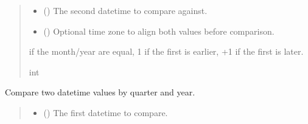 \documentclass[letterpaper,10pt,english]{sphinxmanual}
\begin{document}
\begin{fulllineitems}
\begin{fulllineitems}
\begin{quote}
\begin{description}
\begin{itemize}
\item {} 
\sphinxAtStartPar
{} () \textendash{} The second datetime to compare against.

\item {} 
\sphinxAtStartPar
{} (\sphinxstyleliteralemphasis{\sphinxupquote{{[}}}\sphinxstyleliteralemphasis{\sphinxupquote{{]}}}) \textendash{} Optional time zone to align both values before comparison.

\end{itemize}

 if the month/year are equal,
\sphinxhyphen{}1 if the first is earlier,
+1 if the first is later.

\sphinxAtStartPar
int

\end{description}\end{quote}

\end{fulllineitems}


\begin{fulllineitems}
\label{\detokenize{apache_commons_validator_python.routines:apache_commons_validator_python.routines.date_validator.DateValidator.compare_quarters}}
\pysigstartsignatures
{}
\pysigstopsignatures
\sphinxAtStartPar
Compare two datetime values by quarter and year.
\begin{quote}\begin{description}
\begin{itemize}
\item {} 
\sphinxAtStartPar
{} () \textendash{} The first datetime to compare.


\end{itemize}
\end{description}
\end{quote}
\end{fulllineitems}
\end{fulllineitems}
\end{document}
